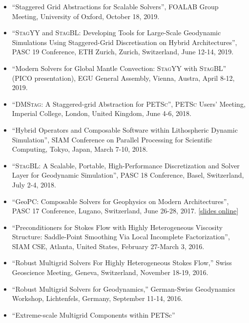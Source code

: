 \begin{itemize}
  \item  ``Staggered Grid Abstractions for Scalable Solvers'', FOALAB Group Meeting, University of Oxford, October 18, 2019.
\item ``\textsc{StagYY} and \textsc{StagBL}: Developing Tools for Large-Scale Geodynamic Simulations Using Staggered-Grid Discretisation on Hybrid Architectures'', PASC 19 Conference, ETH Zurich, Zurich, Switzerland, June 12-14, 2019.
\item ``Modern Solvers for Global Mantle Convection: \textsc{StagYY} with \textsc{StagBL}'' (PICO presentation), EGU General Assembly, Vienna, Austra, April 8-12, 2019.
\item ``\textsc{DMStag}: A Staggered-grid Abstraction for \textsc{PETSc}'', \textsc{PETSc} Users' Meeting, Imperial College, London, United Kingdom, June 4-6, 2018.
\item ``Hybrid Operators and Composable Software within Lithospheric Dynamic Simulation'', SIAM Conference on Parallel Processing for Scientific Computing, Tokyo, Japan, March 7-10, 2018.
\item ``\textsc{StagBL}: A Scalable, Portable, High-Performance Discretization and Solver Layer for Geodynamic Simulation'', PASC 18 Conference, Basel, Switzerland, July 2-4, 2018.
\item ``GeoPC: Composable Solvers for Geophysics on Modern Architectures'', PASC 17 Conference, Lugano, Switzerland, June 26-28, 2017. [\href{http://patricksanan.com/talks/SANAN_patrick_PASC17.pdf}{slides online}]
\item ``Preconditioners for Stokes Flow with Highly Heterogeneous Viscosity Structure: Saddle-Point Smoothing Via Local Incomplete Factorization'', SIAM CSE, Atlanta, United States, February 27-March 3, 2016.
\item ``Robust Multigrid Solvers For Highly Heterogeneous Stokes Flow,'' Swiss Geoscience Meeting, Geneva, Switzerland, November 18-19, 2016.
\item ``Robust Multigrid Solvers for Geodynamics,'' German-Swiss Geodynamics Workshop, Lichtenfels, Germany, September 11-14, 2016.
\item ``Extreme-scale Multigrid Components within PETSc''
\vspace{-8pt}
\end{itemize}
